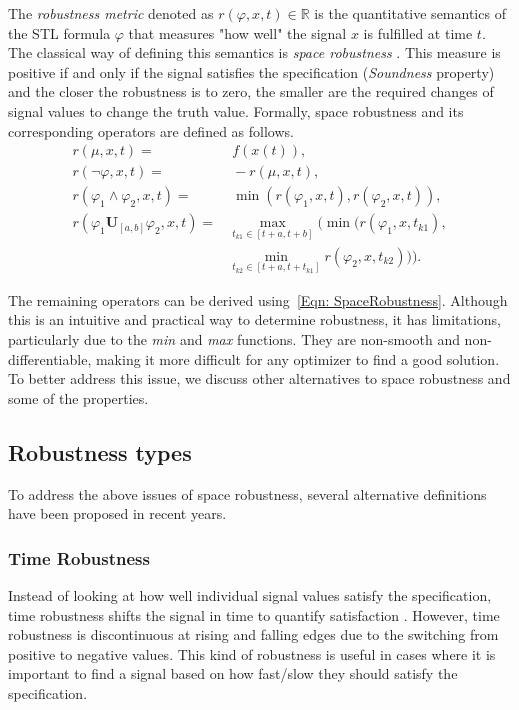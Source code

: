 \documentclass[conference]{IEEEtran}
\begin{document}
The \emph{robustness metric} denoted as $r(\varphi, x, t) \in \mathbb{R}$ is the quantitative semantics of the STL formula $\varphi$ that measures "how well" the signal $x$ is fulfilled at time $t$.
The classical way of defining this semantics is \emph{space robustness} \cite{belta2019formal}. 
This measure is positive if and only if the signal satisfies the specification (\emph{Soundness} property) and the closer the robustness is to zero, the smaller are the required changes of signal values to change the truth value.
Formally, space robustness and its corresponding operators are defined as follows. 
\begin{equation}
  \begin{aligned}
    r(\mu, x, t) =&\; f(x(t)) , \\
    r(\neg\varphi, x, t) =&\; -r(\mu, x, t) ,\\
    r(\varphi_1\land\varphi_2, x, t) =&\; \operatorname{min} (r(\varphi_1, x, t), r(\varphi_2, x, t)) ,\\
    r(\varphi_1 \mathbf{U}_{[a,b]}\varphi_2, x, t) =& \operatorname{max}_{t_{k1} \in [t+a, t+b]} (\operatorname{min} (r(\varphi_1, x, t_{k1}),\\ 
        & \operatorname{min}_{t_{k2} \in [t+a, t+t_{k1}]}r(\varphi_2, x, t_{k2}) )) .
  \end{aligned}
\label{Eqn: SpaceRobustness}
\end{equation}

The remaining operators can be derived using~\eqref{Eqn: SpaceRobustness}. 
Although this is an intuitive and practical way to determine robustness, it has limitations, particularly due to the \emph{min} and \emph{max} functions.
They are non-smooth and non-differentiable, making it more difficult for any optimizer to find a good solution.
To better address this issue, we discuss other alternatives to space robustness and some of the properties. 

\subsection{Robustness types}
To address the above issues of space robustness, several alternative definitions have been proposed in recent years.

\subsubsection{Time Robustness}
Instead of looking at how well individual signal values satisfy the specification, time robustness shifts the signal in time to quantify satisfaction \cite{donze2010robust}. 
However, time robustness is discontinuous at rising and falling edges due to the switching from positive to negative values.
This kind of robustness is useful in cases where it is important to find a signal based on how fast/slow they should satisfy the specification.
\end{document}
